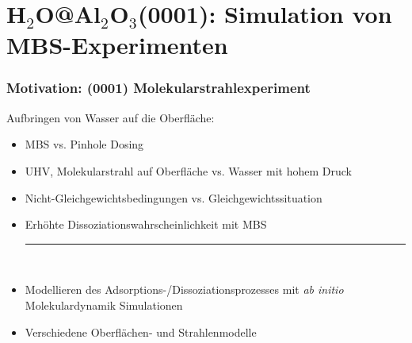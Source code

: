 \documentclass[hyperref={pdfpagelabels=false}]{beamer}
\begin{document}
\section{H$_2$O@Al$_2$O$_3$(0001): Simulation von MBS-Experimenten~~~~~~~~~~}
\begin{frame}
 \frametitle{Motivation: (0001) Molekularstrahlexperiment}
Aufbringen von Wasser auf die Oberfläche: 
 \begin{itemize}
 \item MBS vs. Pinhole Dosing
 \item UHV, Molekularstrahl auf Oberfläche vs. Wasser mit hohem Druck
 \item Nicht-Gleichgewichtsbedingungen vs. Gleichgewichtssituation
 \item {\color{red} Erhöhte Dissoziationswahrscheinlichkeit mit MBS}
 \newline~
 \pause \hrule
 \newline~
 \item Modellieren des Adsorptions-/Dissoziationsprozesses mit \textit{ab initio} Molekulardynamik Simulationen
 \item Verschiedene Oberflächen- und Strahlenmodelle
\end{itemize}
\pause
\newline~\newline~
\end{frame}
\end{document}
